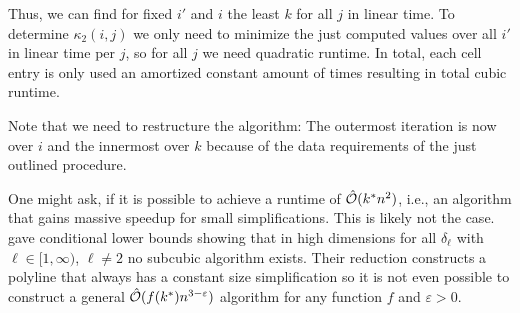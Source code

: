 Thus, we can find for fixed \(i'\) and \(i\) the least \(k\) for all \(j\) in linear time. To determine \(\kappa_2(i, j)\) we only need to minimize the just computed values over all \(i'\) in linear time per \(j\), so for all \(j\) we need quadratic runtime. In total, each cell entry is only used an amortized constant amount of times resulting in total cubic runtime. 

Note that we need to restructure the algorithm: The outermost iteration is now over \(i\) and the innermost over \(k\) because of the data requirements of the just outlined procedure. 

One might ask, if it is possible to achieve a runtime of \(\hat{\mathcal{O}}(k^*n^2)\), i.e., an algorithm that gains massive speedup for small simplifications. This is likely not the case. \citeauthor{polyline_simplification_has_cubic_complexity_bringmannetal}~\cite{polyline_simplification_has_cubic_complexity_bringmannetal} gave conditional lower bounds showing that in high dimensions for all \(\delta_\ell\) with \(\ell \in [1, \infty)\), \(\ell \neq 2\) no subcubic algorithm exists. Their reduction constructs a polyline that always has a constant size simplification so it is not even possible to construct a general \(\hat{\mathcal{O}}(f(k^*)n^{3-\varepsilon})\) algorithm for any function \(f\) and \(\varepsilon > 0\).







